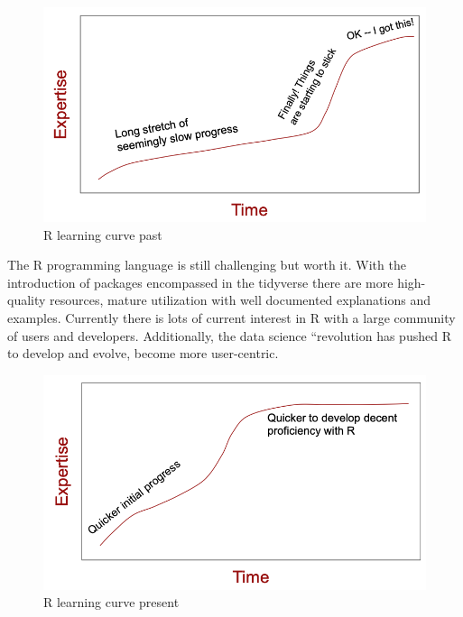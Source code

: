 \documentclass[
]{book}
\begin{document}
\begin{figure}

{\centering \includegraphics[width=11.21in]{images/01_001_r_learning_curve_past} 

}

\caption{\label{fig:1001}R learning curve past}\label{fig:1001}
\end{figure}

The R programming language is still challenging but worth it. With the introduction of packages encompassed in the tidyverse there are more high-quality resources, mature utilization with well documented explanations and examples. Currently there is lots of current interest in R with a large community of users and developers. Additionally, the data science ``revolution has pushed R to develop and evolve, become more user-centric.

\begin{figure}

{\centering \includegraphics[width=11.21in]{images/01_002_r_learning_curve_present} 

}

\caption{\label{fig:1002}R learning curve present}\label{fig:1002}
\end{figure}
\end{document}
